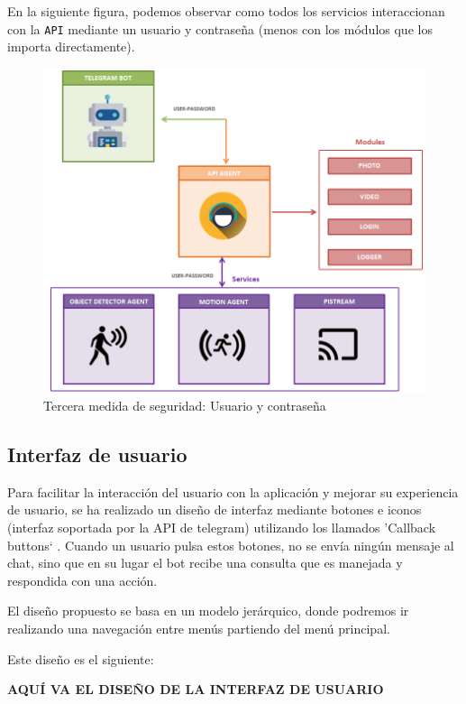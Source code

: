 En la siguiente figura, podemos observar como todos los servicios interaccionan con la \texttt{API} mediante un usuario y contraseña (menos con los módulos que los importa directamente).

\newpage

\begin{figure}[h]
	\centering
	\includegraphics[scale=0.5]{images/38}
	\caption{Tercera medida de seguridad: Usuario y contraseña}
	\label{img:seg3}
\end{figure}

\subsection{Interfaz de usuario}

Para facilitar la interacción del usuario con la aplicación y mejorar su experiencia de usuario, se ha realizado un diseño de interfaz mediante botones e iconos (interfaz soportada por la API de telegram) utilizando los llamados 'Callback buttons` \cite{refx1}. Cuando un usuario pulsa estos botones, no se envía ningún mensaje al chat, sino que en su lugar el bot recibe una consulta que es manejada y respondida con una acción.

El diseño propuesto se basa en un modelo jerárquico, donde podremos ir realizando una navegación entre menús partiendo del menú principal.

Este diseño es el siguiente:

\textbf{AQUÍ VA EL DISEÑO DE LA INTERFAZ DE USUARIO} 

